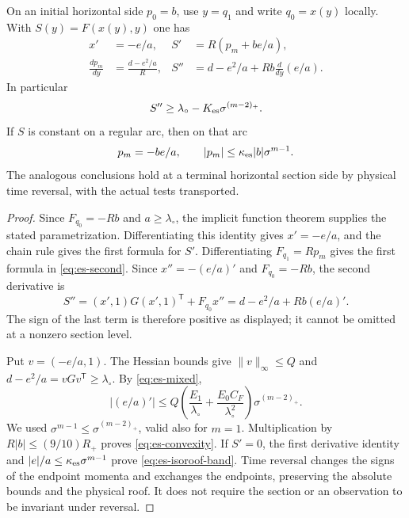 \begin{lemma}
\label{lem:es-restriction}
On an initial horizontal side $p_0=b$, use $y=q_1$ and write
$q_0=x(y)$ locally.  With $S(y)=F(x(y),y)$ one has
\begin{align}
 x'&=-e/a,&
 S'&=R(p_m+b e/a),
                                                   \label{eq:es-first}\\
 \frac{dp_m}{dy}&=\frac{d-e^2/a}{R},&
 S''&=d-e^2/a+Rb\frac{d}{dy}(e/a).
                                                   \label{eq:es-second}
\end{align}
In particular
\begin{equation}\label{eq:es-convexity}
 S''\ge\lambda_\circ-K_{\rm es}\sigma^{(m-2)_+}.
\end{equation}
If $S$ is constant on a regular arc, then on that arc
\begin{equation}\label{eq:es-isoroof-band}
 p_m=-b e/a,
 \qquad |p_m|\le\kappa_{\rm es}|b|\sigma^{m-1}.
\end{equation}
The analogous conclusions hold at a terminal horizontal section
side by physical time reversal, with the actual tests transported.
\end{lemma}
\begin{proof}
Since $F_{q_0}=-Rb$ and $a\ge\lambda_\circ$, the implicit function
theorem supplies the stated parametrization.  Differentiating this
identity gives $x'=-e/a$, and the chain rule gives the first formula
for $S'$.  Differentiating $F_{q_1}=Rp_m$ gives the first formula
in \eqref{eq:es-second}.  Since $x''=-(e/a)'$ and
$F_{q_0}=-Rb$, the second derivative is
\[
 S''=(x',1)G(x',1)^{\mathsf T}+F_{q_0}x''
     =d-e^2/a+Rb(e/a)'.
\]
The sign of the last term is therefore positive as displayed;
it cannot be omitted at a nonzero section level.

Put $v=(-e/a,1)$.  The Hessian bounds give
$\|v\|_\infty\le Q$ and $d-e^2/a=vGv^{\mathsf T}
\ge\lambda_\circ$.  By \eqref{eq:es-mixed},
\[
 |(e/a)'|\le Q\left(\frac{E_1}{\lambda_\circ}
              +\frac{E_0C_F}{\lambda_\circ^2}\right)
                    \sigma^{(m-2)_+}.
\]
We used $\sigma^{m-1}\le\sigma^{(m-2)_+}$, valid also for
$m=1$.  Multiplication by $R|b|\le(9/10)R_+$ proves
\eqref{eq:es-convexity}.  If $S'=0$, the first derivative identity
and $|e|/a\le\kappa_{\rm es}\sigma^{m-1}$ prove
\eqref{eq:es-isoroof-band}.  Time reversal changes the signs of
the endpoint momenta and exchanges the endpoints, preserving the
absolute bounds and the physical roof.  It does not require the
section or an observation to be invariant under reversal.
\end{proof}

